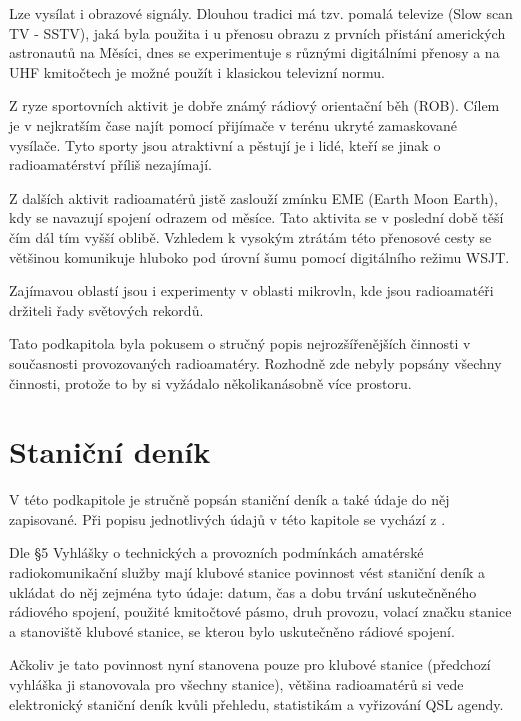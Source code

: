 Lze vysílat i obrazové signály. Dlouhou tradici má tzv. pomalá televize (Slow
    scan TV - SSTV),
jaká byla použita i u přenosu obrazu z prvních přistání amerických astronautů na Měsíci,
dnes se experimentuje s různými digitálními přenosy a na UHF kmitočtech je možné
použít i klasickou televizní normu.

Z ryze sportovních aktivit je dobře známý rádiový
orientační běh (ROB). Cílem je v nejkratším čase najít pomocí
přijímače v terénu ukryté zamaskované vysílače. 
Tyto sporty jsou atraktivní a pěstují je i lidé, kteří se jinak o radioamatérství příliš nezajímají.

Z dalších aktivit radioamatérů jistě zaslouží zmínku EME (Earth Moon Earth), kdy
se navazují spojení odrazem od měsíce. Tato aktivita se v poslední době těší čím
dál tím vyšší oblibě. Vzhledem k vysokým ztrátám této přenosové cesty se
většinou komunikuje hluboko pod úrovní šumu pomocí digitálního režimu WSJT.

Zajímavou oblastí jsou i experimenty v oblasti mikrovln, kde jsou radioamatéři
držiteli řady světových rekordů. 

Tato podkapitola byla pokusem o stručný popis nejrozšířenějších činnosti v současnosti provozovaných
radioamatéry. Rozhodně zde nebyly popsány všechny činnosti, protože to by si
vyžádalo několikanásobně více prostoru.

\section{Staniční deník}
\label{stanicni_denik}

V této podkapitole je stručně popsán staniční deník a také údaje do něj zapisované.
Při popisu jednotlivých údajů v této kapitole se vychází z \cite{pozadavky}.

Dle §5 Vyhlášky o technických a provozních podmínkách amatérské radiokomunikační služby \cite{vyhlaska}
mají klubové stanice povinnost vést staniční deník a ukládat do něj zejména tyto údaje: datum, čas a dobu trvání
uskutečněného rádiového spojení, použité kmitočtové pásmo, druh provozu,
volací značku stanice a stanoviště klubové stanice, se kterou bylo uskutečněno rádiové spojení.

Ačkoliv je tato povinnost nyní stanovena pouze pro klubové stanice (předchozí
vyhláška ji stanovovala pro všechny stanice), většina radioamatérů si vede
elektronický staniční deník kvůli přehledu, statistikám a
vyřizování QSL agendy.

